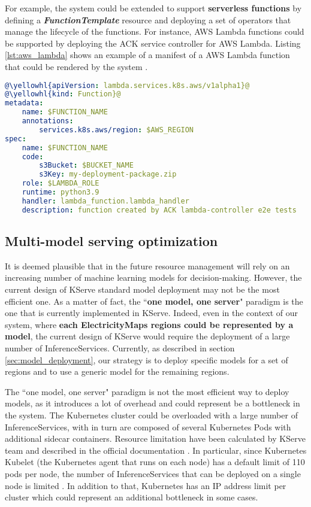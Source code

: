 For example, the system could be extended to support \textbf{serverless functions} by defining a \textbf{\textit{FunctionTemplate}} resource and deploying a set of operators that manage the lifecycle of the functions.
For instance, AWS Lambda functions could be supported by deploying the ACK service controller for AWS Lambda.
Listing \ref{lst:aws_lambda} shows an example of a manifest of a AWS Lambda function that could be rendered by the system \cite{aws_lambda_ack}. \newline

\begin{lstlisting}[language=yaml, caption=AWS Lambda manifest example \cite{aws_lambda_ack}, label=lst:aws_lambda]
@\yellowhl{apiVersion: lambda.services.k8s.aws/v1alpha1}@
@\yellowhl{kind: Function}@
metadata:
    name: $FUNCTION_NAME
    annotations:
        services.k8s.aws/region: $AWS_REGION
spec:
    name: $FUNCTION_NAME
    code:
        s3Bucket: $BUCKET_NAME
        s3Key: my-deployment-package.zip
    role: $LAMBDA_ROLE
    runtime: python3.9
    handler: lambda_function.lambda_handler
    description: function created by ACK lambda-controller e2e tests
\end{lstlisting}

\subsection{Multi-model serving optimization}

It is deemed plausible that in the future resource management will rely on an increasing number of machine learning models for decision-making.
However, the current design of KServe standard model deployment may not be the most efficient one.
As a matter of fact, the ``\textbf{one model, one server}" paradigm is the one that is currently implemented in KServe.
Indeed, even in the context of our system, where \textbf{each ElectricityMaps regions could be represented by a model}, the current design of KServe would require the deployment of a large number of InferenceServices.
Currently, as described in section \ref{sec:model_deployment}, our strategy is to deploy specific models for a set of regions and to use a generic model for the remaining regions.

The ``one model, one server" paradigm is not the most efficient way to deploy models, as it introduces a lot of overhead and could represent be a bottleneck in the system.
The Kubernetes cluster could be overloaded with a large number of InferenceServices, with in turn are composed of several Kubernetes Pods with additional sidecar containers.
Resource limitation have been calculated by KServe team and described in the official documentation \cite{kserve_multi_model}.
In particular, since Kubernetes Kubelet (the Kubernetes agent that runs on each node) has a default limit of 110 pods per node, the number of InferenceServices that can be deployed on a single node is limited \cite{kserve_multi_model}.
In addition to that, Kubernetes has an IP address limit per cluster which could represent an additional bottleneck in some cases.

